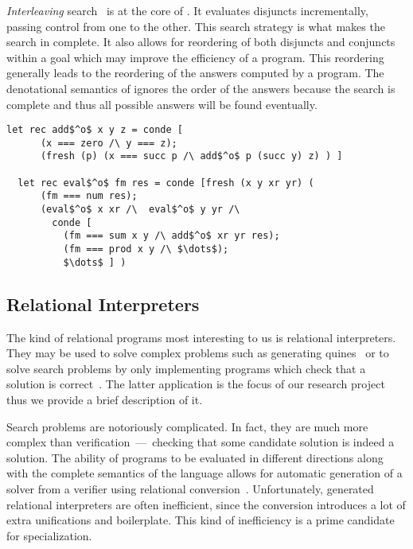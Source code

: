 \emph{Interleaving} search~\cite{10.1145/1090189.1086390} is at the core of \mk.
It evaluates disjuncts incrementally, passing control from one to the other.
This search strategy is what makes the search in \mk complete.
It also allows for reordering of both disjuncts and conjuncts within a goal which may improve the efficiency of a program.
This reordering generally leads to the reordering of the answers computed by a \mk program.
The denotational semantics of \mk ignores the order of the answers because the search is complete and thus all possible answers will be found eventually.

\begin{figure*}[!t]
  \centering
  \begin{minipage}{0.68\textwidth}
    \begin{lstlisting}[label={eval:arith}, caption={Evaluator of arithmetic expressions}, captionpos=b, frame=tb]
  let rec add$^o$ x y z = conde [
      (x === zero /\ y === z);
      (fresh (p) (x === succ p /\ add$^o$ p (succ y) z) ) ]

  let rec eval$^o$ fm res = conde [fresh (x y xr yr) (
      (fm === num res);
      (eval$^o$ x xr /\  eval$^o$ y yr /\
        conde [
          (fm === sum x y /\ add$^o$ xr yr res);
          (fm === prod x y /\ $\dots$);
          $\dots$ ] )
    \end{lstlisting}
  \end{minipage}
\end{figure*}


\subsection{Relational Interpreters}

The kind of relational programs most interesting to us is relational interpreters.
They may be used to solve complex problems such as generating quines~\cite{byrd2012minikanren} or to solve search problems by only implementing programs which check that a solution is correct~\cite{lozov2019relational}.
The latter application is the focus of our research project thus we provide a brief description of it.

Search problems are notoriously complicated.
In fact, they are much more complex than verification~---~checking that some candidate solution is indeed a solution.
The ability of \mk programs to be evaluated in different directions along with the complete semantics of the language allows for automatic generation of a solver from a verifier using relational conversion~\cite{lozov2017typed}.
Unfortunately, generated relational interpreters are often inefficient, since the conversion introduces a lot of extra unifications and boilerplate.
This kind of inefficiency is a prime candidate for specialization.

